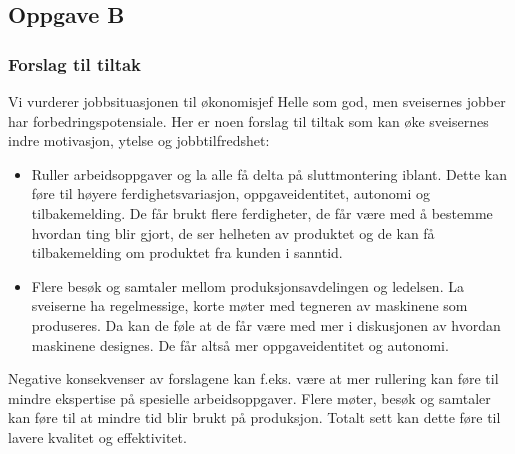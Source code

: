 \subsection{Oppgave B}
\subsubsection{Forslag til tiltak}
Vi vurderer jobbsituasjonen til økonomisjef Helle som god, men sveisernes jobber har forbedringspotensiale. Her er noen forslag til tiltak som kan øke sveisernes indre motivasjon, ytelse og jobbtilfredshet:

\begin{itemize}
  \item Ruller arbeidsoppgaver og la alle få delta på sluttmontering iblant. Dette kan føre til høyere ferdighetsvariasjon, oppgaveidentitet, autonomi og tilbakemelding. De får brukt flere ferdigheter, de får være med å bestemme hvordan ting blir gjort, de ser helheten av produktet og de kan få tilbakemelding om produktet fra kunden i sanntid.
  \item Flere besøk og samtaler mellom produksjonsavdelingen og ledelsen. La sveiserne ha regelmessige, korte møter med tegneren av maskinene som produseres. Da kan de føle at de får være med mer i diskusjonen av hvordan maskinene designes. De får altså mer oppgaveidentitet og autonomi.
\end{itemize}

Negative konsekvenser av forslagene kan f.eks. være at mer rullering kan føre til mindre ekspertise på spesielle arbeidsoppgaver. Flere møter, besøk og samtaler kan føre til at mindre tid blir brukt på produksjon. Totalt sett kan dette føre til lavere kvalitet og effektivitet.

